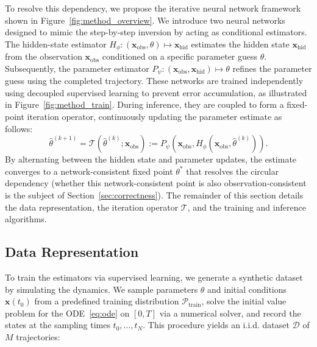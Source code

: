 To resolve this dependency, we propose the iterative neural network framework shown in Figure~\ref{fig:method_overview}.
We introduce two neural networks designed to mimic the step-by-step inversion by acting as conditional estimators.
The hidden-state estimator $H_\phi:(\mathbf{x}_\mathrm{obs},\theta)\mapsto \mathbf{x}_\mathrm{hid}$ estimates the hidden state $\mathbf{x}_\mathrm{hid}$ from the observation $\mathbf{x}_\mathrm{obs}$ conditioned on a specific parameter guess $\theta$.
Subsequently, the parameter estimator $P_\psi:(\mathbf{x}_\mathrm{obs}, \mathbf{x}_\mathrm{hid})\mapsto \theta$ refines the parameter guess using the completed trajectory.
These networks are trained independently using decoupled supervised learning to prevent error accumulation, as illustrated in Figure~\ref{fig:method_train}. 
During inference, they are coupled to form a fixed-point iteration operator, continuously updating the parameter estimate as follows:
\begin{equation}
    \hat\theta^{(k+1)}=\mathcal{T}(\hat\theta^{(k)};\mathbf{x}_\mathrm{obs}) := P_\psi(\mathbf{x}_\mathrm{obs},H_\phi(\mathbf{x}_\mathrm{obs},\hat\theta^{(k)})).
\end{equation}
By alternating between the hidden state and parameter updates, the estimate converges to a network-consistent fixed point $\theta^*$ that resolves the circular dependency (whether this network-consistent point is also observation-consistent is the subject of Section~\ref{sec:correctness}).
The remainder of this section details the data representation, the iteration operator $\mathcal{T}$, and the training and inference algorithms.


\subsection{Data Representation}
\label{subsec:data_gen}

To train the estimators via supervised learning, we generate a synthetic dataset by simulating the dynamics.
We sample parameters $\theta$ and initial conditions $\mathbf{x}(t_0)$ from a predefined training distribution $\mathcal{P}_\mathrm{train}$, solve the initial value problem for the ODE~\eqref{eq:ode} on $[0, T]$ via a numerical solver, and record the states at the sampling times $t_0, \ldots, t_{N}$. 
This procedure yields an i.i.d. dataset $\mathcal{D}$ of $M$ trajectories:

